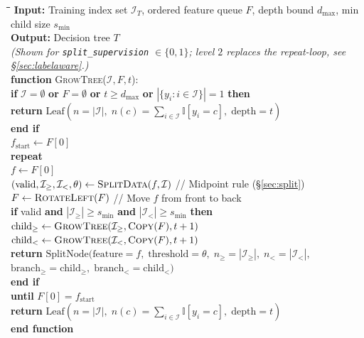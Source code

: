 \documentclass[11pt,a4paper]{article}
\newcommand{\code}[1]{\texttt{#1}}
\newcommand{\algkw}[1]{\textbf{#1}}
\newcommand{\algfn}[1]{\textsc{#1}}
\newcommand{\algcm}[1]{\quad\textcolor{MutedGray}{\footnotesize // #1}}
\newcommand{\Ind}{\mathbb{I}}
\begin{document}
\begin{algorithm}[htbp]
  \caption{Impurity-Free Cyclic-Queue Tree Induction (\code{PlantTree})}
  \label{alg:planttree}
  \small
  \begin{tabbing}
    \hspace{1.2em}\=\hspace{1.2em}\=\hspace{1.2em}\=\hspace{1.2em}\=\kill
    \textbf{Input:} Training index set $\mathcal{I}_T$, ordered feature queue $F$, depth bound $d_{\max}$, min child size $s_{\min}$ \\
    \textbf{Output:} Decision tree $T$ \\
    \textit{(Shown for \code{split\_supervision} $\in \{0, 1\}$; level $2$ replaces the repeat-loop, see \S\ref{sec:labelaware}.)} \\[4pt]
    \algkw{function} \algfn{GrowTree}($\mathcal{I}, F, t$): \\
    \> \algkw{if} $\mathcal{I} = \emptyset$ \algkw{or} $F = \emptyset$ \algkw{or} $t \ge d_{\max}$ \algkw{or} $|\{y_i : i \in \mathcal{I}\}| = 1$ \algkw{then} \\
    \> \> \algkw{return} $\text{Leaf}\!\left(n = |\mathcal{I}|,\; n(c) = \sum_{i \in \mathcal{I}} \Ind[y_i = c],\; \text{depth} = t\right)$ \\
    \> \algkw{end if} \\[2pt]
    \> $f_{\text{start}} \gets F[0]$ \\
    \> \algkw{repeat} \\
    \> \> $f \gets F[0]$ \\
    \> \> $(\text{valid}, \mathcal{I}_{\ge}, \mathcal{I}_{<}, \theta) \gets \text{\algfn{SplitData}}(f, \mathcal{I})$ \algcm{Midpoint rule (\S\ref{sec:split})} \\
    \> \> $F \gets \text{\algfn{RotateLeft}}(F)$ \algcm{Move $f$ from front to back} \\
    \> \> \algkw{if} valid \algkw{and} $|\mathcal{I}_{\ge}| \ge s_{\min}$ \algkw{and} $|\mathcal{I}_{<}| \ge s_{\min}$ \algkw{then} \\
    \> \> \> $\text{child}_{\ge} \gets \text{\algfn{GrowTree}}(\mathcal{I}_{\ge}, \text{\algfn{Copy}}(F), t + 1)$ \\
    \> \> \> $\text{child}_{<} \gets \text{\algfn{GrowTree}}(\mathcal{I}_{<}, \text{\algfn{Copy}}(F), t + 1)$ \\
    \> \> \> \algkw{return} $\text{SplitNode}\!\big(\text{feature} = f,\; \text{threshold} = \theta,\; n_{\ge} = |\mathcal{I}_{\ge}|,\; n_{<} = |\mathcal{I}_{<}|,$ \\
    \> \> \> \> $\text{branch}_{\ge} = \text{child}_{\ge},\; \text{branch}_{<} = \text{child}_{<}\big)$ \\
    \> \> \algkw{end if} \\
    \> \algkw{until} $F[0] = f_{\text{start}}$ \\[2pt]
    \> \algkw{return} $\text{Leaf}\!\left(n = |\mathcal{I}|,\; n(c) = \sum_{i \in \mathcal{I}} \Ind[y_i = c],\; \text{depth} = t\right)$ \\
    \algkw{end function}
  \end{tabbing}
\end{algorithm}
\end{document}
